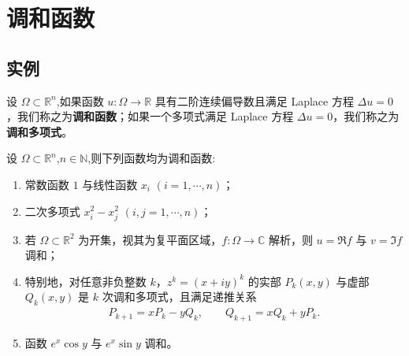 \documentclass[../../main.tex]{subfiles}%
\begin{document}
\section{调和函数}

\subsection{实例}

\begin{definition}
设 $\Omega\subset \mathbb{R}^n$,如果函数 $u:\Omega\to\mathbb{R}$ 具有二阶连续偏导数且满足 Laplace 方程 $\Delta u = 0$，我们称之为\textbf{调和函数}；如果一个多项式满足 Laplace 方程 $\Delta u = 0$，我们称之为\textbf{调和多项式}。
\end{definition}

\begin{proposition}
设 $\Omega\subset \mathbb{R}^n$,$n\in \mathbb{N}$,则下列函数均为调和函数:
\begin{enumerate}[(1)]
\item 常数函数 $1$ 与线性函数 $x_i$ $(i=1,\cdots,n)$；
\item 二次多项式 $x_i^2-x_j^2$ $(i,j=1,\cdots,n)$；
\item 若 $\Omega\subset\mathbb R^2$ 为开集，视其为复平面区域，$f:\Omega\to\mathbb C$ 解析，则 $u=\Re f$ 与 $v=\Im f$ 调和；
\item 特别地，对任意非负整数 $k$，$z^k=(x+iy)^k$ 的实部 $P_k(x,y)$ 与虚部 $Q_k(x,y)$ 是 $k$ 次调和多项式，且满足递推关系
\begin{align}
P_{k+1}=xP_k-yQ_k,\qquad Q_{k+1}=xQ_k+yP_k. \label{rec:pq}
\end{align}
\item 函数 $e^x\cos y$ 与 $e^x\sin y$ 调和。
\end{enumerate}
\end{proposition}
\end{document}
